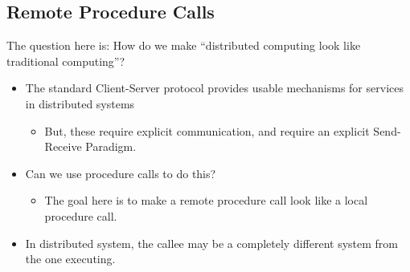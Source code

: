 \subsection{Remote Procedure Calls}\label{subsec:RPC}
The question here is: How do we make ``distributed computing look like traditional computing''?
\begin{itemize}[noitemsep]
\item The standard Client-Server protocol provides usable mechanisms for services in distributed systems
  \begin{itemize}[noitemsep]
  \item But, these require explicit communication, and require an explicit Send-Receive Paradigm.
  \end{itemize}
\item Can we use procedure calls to do this?
  \begin{itemize}[noitemsep]
  \item The goal here is to make a remote procedure call look like a local procedure call.
  \end{itemize}
\item In distributed system, the callee may be a completely different system from the one executing.
\end{itemize}


